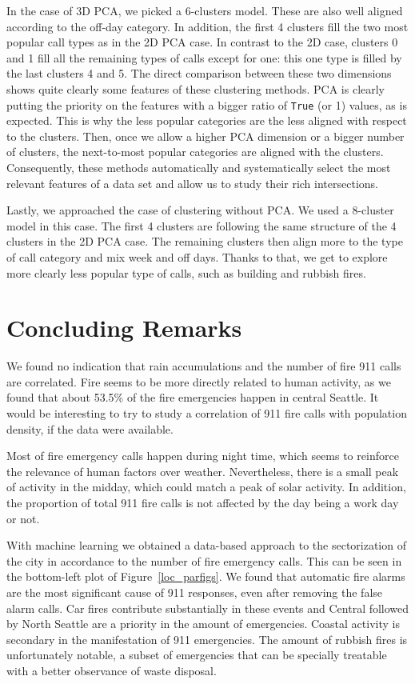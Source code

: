 \documentclass[12pt,a4paper]{article}
\begin{document}
In the case of 3D PCA, we picked a 6-clusters model. These are also well aligned according to the off-day category. In addition, the first 4 clusters fill the two most popular call types as in the 2D PCA case. In contrast to the 2D case, clusters 0 and 1 fill all the remaining types of calls except for one: this one type is filled by the last clusters 4 and 5. The direct comparison between these two dimensions shows quite clearly some features of these clustering methods. PCA is clearly putting the priority on the features with a bigger ratio of \verb|True| (or 1) values, as is expected. This is why the less popular categories are the less aligned with respect to the clusters. Then, once we allow a higher PCA dimension or a bigger number of clusters, the next-to-most popular categories are aligned with the clusters. Consequently, these methods automatically and systematically select the most relevant features of a data set and allow us to study their rich intersections.

Lastly, we approached the case of clustering without PCA. We used a 8-cluster model in this case. The first 4 clusters are following the same structure of the 4 clusters in the 2D PCA case. The remaining clusters then align more to the type of call category and mix week and off days. Thanks to that, we get to explore more clearly less popular type of calls, such as building and rubbish fires.


\section{Concluding Remarks}

We found no indication that rain accumulations and the number of fire 911 calls are correlated. Fire seems to be more directly related to human activity, as we found that about 53.5\% of the fire emergencies happen in central Seattle. It would be interesting to try to study a correlation of 911 fire calls with population density, if the data were available.

Most of fire emergency calls happen during night time, which seems to reinforce the relevance of human factors over weather. Nevertheless, there is a small peak of activity in the midday, which could match a peak of solar activity. In addition, the proportion of total 911 fire calls is not affected by the day being a work day or not.

With machine learning we obtained a data-based approach to the sectorization of the city in accordance to the number of fire emergency calls. This can be seen in the bottom-left plot of Figure~\ref{loc_parfigs}. We found that automatic fire alarms are the most significant cause of 911 responses, even after removing the false alarm calls. Car fires contribute substantially in these events and Central followed by North Seattle are a priority in the amount of emergencies. Coastal activity is secondary in the manifestation of 911 emergencies. The amount of rubbish fires is unfortunately notable, a subset of emergencies that can be specially treatable with a better observance of waste disposal.
\end{document}
